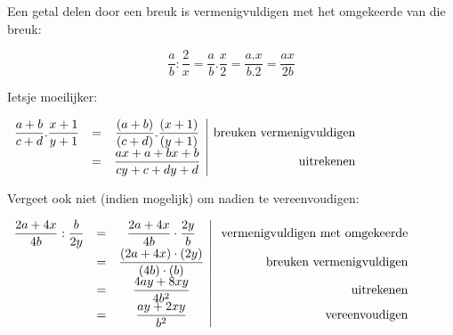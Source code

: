 	\begin{voorbeeld}
	Een getal delen door een breuk is vermenigvuldigen met het
	omgekeerde van die breuk:
	
	\begin{equation*}
		{\displaystyle \frac{a}{b}:\frac{2}{x}=\frac{a}{b}.\frac{x}{2}=\frac{a.x}{b.2}=\frac{ax}{2b}}
	\end{equation*}	
	
	\end{voorbeeld}

\begin{voorbeeld}
		Ietsje moeilijker:
	
	\begin{math}
		\centering
	\begin{array}{ccc|r}
	{\displaystyle \frac{a+b}{c+d}.\frac{x+1}{y+1}} & = & {\displaystyle \frac{(a+b)}{(c+d)}.\frac{(x+1)}{(y+1)}} & \text{breuken vermenigvuldigen}\\
	& = & {\displaystyle \frac{ax+a+bx+b}{cy+c+dy+d}} & \text{uitrekenen}\\
	\end{array}
	\end{math}
\end{voorbeeld}
	
	
	
\begin{voorbeeld}
		Vergeet ook niet (indien mogelijk) om nadien te vereenvoudigen:
	
	\begin{math}
	\centering
	\begin{array}{ccc|r}
	{\displaystyle \frac{2a+4x}{4b}:\frac{b}{2y}} & = & {\displaystyle \frac{2a+4x}{4b}\cdot\frac{2y}{b}} & \text{ vermenigvuldigen met omgekeerde}\\
	& = & {\displaystyle \frac{(2a+4x)\cdot(2y)}{(4b)\cdot(b)}} & \text{breuken vermenigvuldigen}\\
	& = & {\displaystyle \frac{4ay+8xy}{4b^{2}}} &  \text{uitrekenen}\\
	& = & {\displaystyle \frac{ay+2xy}{b^{2}}} & \text{vereenvoudigen}\\
	\end{array}
	\end{math}
\end{voorbeeld}
	
